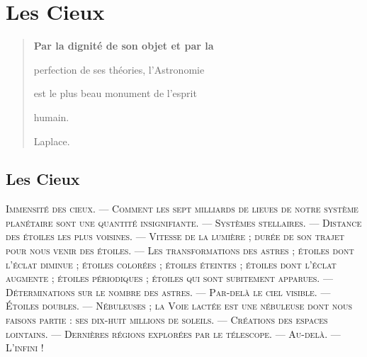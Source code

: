 \documentclass[a4paper, 11pt, oneside, landscape]{article}
\begin{document}
\section{Les Cieux}
\begin{quotation}\bfseries\small
Par la dignité de son objet et par la

perfection de ses théories, l'Astronomie

est le plus beau monument de l'esprit

humain.

\hspace*{5mm}Laplace.
\end{quotation}

\bigskip

\subsection{Les Cieux}
\begin{center}
\scshape
\small
Immensité des cieux. --- Comment les sept milliards de lieues de notre système planétaire sont une quantité insignifiante. --- Systèmes stellaires. --- Distance des étoiles les plus voisines. --- Vitesse de la lumière ; durée de son trajet pour nous venir des étoiles. --- Les transformations des astres ; étoiles dont l'éclat diminue ; étoiles colorées ; étoiles éteintes ; étoiles dont l'éclat augmente ; étoiles périodiques ; étoiles qui sont subitement apparues. --- Déterminations sur le nombre des astres. --- Par-delà le ciel visible. --- Étoiles doubles. --- Nébuleuses ; la Voie lactée est une nébuleuse dont nous faisons partie : ses dix-huit millions de soleils. --- Créations des espaces lointains. --- Dernières régions explorées par le télescope. --- Au-delà. --- L'infini !
\end{center}
\end{document}
